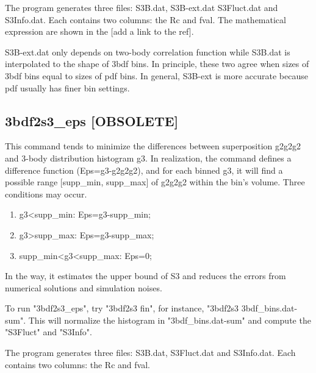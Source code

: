 \documentclass[11pt]{article}
\begin{document}
The program generates three files: S3B.dat, S3B-ext.dat S3Fluct.dat and
S3Info.dat. Each contains two columns: the Rc and fval.  The
mathematical expression are shown in the [add a link to the ref].

S3B-ext.dat only depends on two-body correlation function while
S3B.dat is interpolated to the shape of 3bdf bins. In principle, these
two agree when sizes of 3bdf bins equal to sizes of pdf bins. In
general, S3B-ext is more accurate because pdf usually has finer bin settings.

\subsection{3bdf2s3\_eps [OBSOLETE]}
\label{sec:orgf5f5828}
This command tends to minimize the differences between superposition
g2g2g2 and 3-body distribution histogram g3. In realization, the
command defines a difference function (Eps=g3-g2g2g2), and  for each
binned g3, it will find a possible range [supp\_min, supp\_max] of g2g2g2  within the bin's
volume. Three conditions may occur.
\begin{enumerate}
\item g3<supp\_min: Eps=g3-supp\_min;
\item g3>supp\_max: Eps=g3-supp\_max;
\item supp\_min<g3<supp\_max: Eps=0;
\end{enumerate}
In the way, it estimates the upper bound of S3 and reduces the errors
from numerical solutions and simulation noises.

To run "3bdf2s3\_eps", try "3bdf2s3 fin", for instance, "3bdf2s3
3bdf\_bins.dat-sum". This will normalize the histogram in
"3bdf\_bins.dat-sum" and compute the "S3Fluct" and "S3Info".

The program generates three files: S3B.dat, S3Fluct.dat and
S3Info.dat. Each contains two columns: the Rc and fval.  
\end{document}
